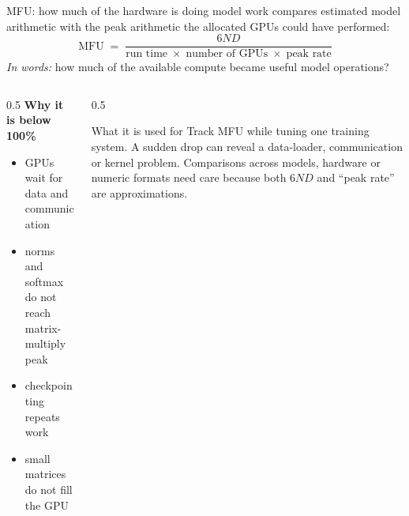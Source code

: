 \documentclass[aspectratio=169,10pt]{beamer}
\begin{document}
\begin{frame}{MFU: how much of the hardware is doing model work}
   compares estimated model arithmetic with
  the peak arithmetic the allocated GPUs could have performed:
  \[
    \mathrm{MFU} \;=\;
      \frac{6ND}{\text{run time}\;\times\;\text{number of GPUs}
                 \;\times\;\text{peak rate}}
  \]
  \emph{In words:} how much of the available compute became useful model
  operations?
  \vspace{0.5em}
  \begin{columns}[T]
    \begin{column}{0.5\textwidth}
      \textbf{Why it is below 100\%}
      \begin{itemize}\small
        \item GPUs wait for data and communication
        \item norms and softmax do not reach matrix-multiply peak
        \item checkpointing repeats work
        \item small matrices do not fill the GPU
      \end{itemize}
    \end{column}
    \begin{column}{0.5\textwidth}
      \begin{block}{What it is used for}
        \small
        Track MFU while tuning one training system. A sudden drop can reveal a
        data-loader, communication or kernel problem.
        \vspace{0.4em}
        Comparisons across models, hardware or numeric formats need care because
        both $6ND$ and ``peak rate'' are approximations.
      \end{block}
    \end{column}
  \end{columns}
\end{frame}
\end{document}
